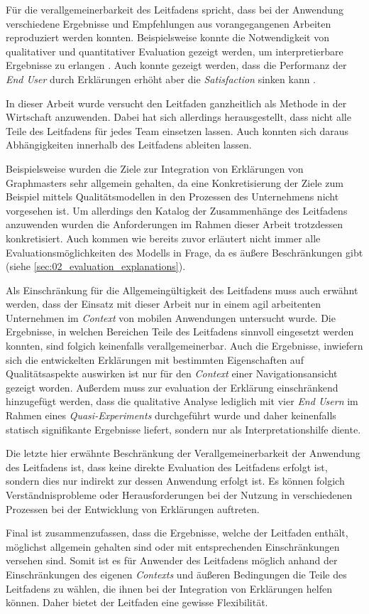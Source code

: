Für die verallgemeinerbarkeit des Leitfadens spricht, dass bei der Anwendung verschiedene Ergebnisse und Empfehlungen aus vorangegangenen Arbeiten reproduziert werden konnten. Beispielsweise konnte die Notwendigkeit von qualitativer und quantitativer Evaluation gezeigt werden, um interpretierbare Ergebnisse zu erlangen \cite{}. Auch konnte gezeigt werden, dass die Performanz der \textit{End User} durch Erklärungen erhöht aber die \textit{Satisfaction} sinken kann \cite{}. 

\smallskip

In dieser Arbeit wurde versucht den Leitfaden ganzheitlich als Methode in der Wirtschaft anzuwenden. Dabei hat sich allerdings herausgestellt, dass nicht alle Teile des Leitfadens für jedes Team einsetzen lassen. Auch konnten sich daraus Abhängigkeiten innerhalb des Leitfadens ableiten lassen.

Beispielsweise wurden die Ziele zur Integration von Erklärungen von Graphmasters sehr allgemein gehalten, da eine Konkretisierung der Ziele zum Beispiel mittels Qualitätsmodellen \cite{schneider2012abenteuer} in den Prozessen des Unternehmens nicht vorgesehen ist. Um allerdings den Katalog der Zusammenhänge des Leitfadens anzuwenden wurden die Anforderungen im Rahmen dieser Arbeit trotzdessen konkretisiert. Auch kommen wie bereits zuvor erläutert nicht immer alle Evaluationsmöglichkeiten des Modells in Frage, da es äußere Beschränkungen gibt (siehe \autoref{sec:02_evaluation_explanations}).

Als Einschränkung für die Allgemeingültigkeit des Leitfadens muss auch erwähnt werden, dass der Einsatz mit dieser Arbeit nur in einem agil arbeitenten Unternehmen im \textit{Context} von mobilen Anwendungen untersucht wurde. Die Ergebnisse, in welchen Bereichen Teile des Leitfadens sinnvoll eingesetzt werden konnten, sind folgich keinenfalls verallgemeinerbar. Auch die Ergebnisse, inwiefern sich die entwickelten Erklärungen mit bestimmten Eigenschaften auf Qualitätsaspekte auswirken ist nur für den \textit{Context} einer Navigationsansicht gezeigt worden. Außerdem muss zur evaluation der Erklärung einschränkend hinzugefügt werden, dass die qualitative Analyse lediglich mit vier \textit{End Usern} im Rahmen eines \textit{Quasi-Experiments} durchgeführt wurde und daher keinenfalls statisch signifikante Ergebnisse liefert, sondern nur als Interpretationshilfe diente.

Die letzte hier erwähnte Beschränkung der Verallgemeinerbarkeit der Anwendung des Leitfadens ist, dass keine direkte Evaluation des Leitfadens erfolgt ist, sondern dies nur indirekt zur dessen Anwendung erfolgt ist. Es können folgich Verständnisprobleme oder Herausforderungen bei der Nutzung in verschiedenen Prozessen bei der Entwicklung von Erklärungen auftreten.

Final ist zusammenzufassen, dass die Ergebnisse, welche der Leitfaden enthält, möglichst allgemein gehalten sind oder mit entsprechenden Einschränkungen versehen sind. Somit ist es für Anwender des Leitfadens möglich anhand der Einschränkungen des eigenen \textit{Contexts} und äußeren Bedingungen die Teile des Leitfadens zu wählen, die ihnen bei der Integration von Erklärungen helfen können. Daher bietet der Leitfaden eine gewisse Flexibilität.